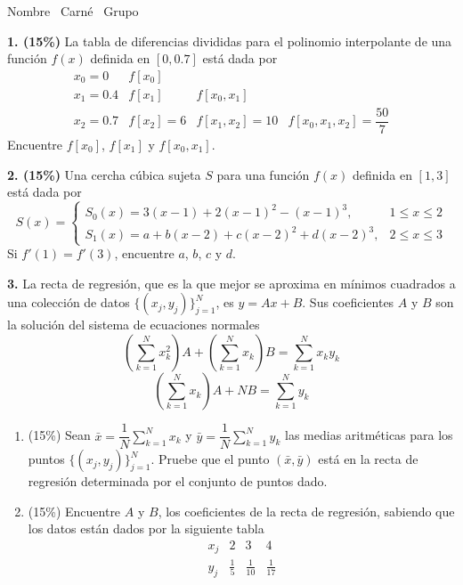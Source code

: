 \documentclass[11pt]{article}
\begin{document}
\examheader

\vspace{6pt}
\noindent Nombre \dotfill\ Carné \dotfill\ Grupo \dotfill

\vspace{10pt}
\noindent\textbf{1. (15\%)} La tabla de diferencias divididas para el polinomio interpolante de una función $f(x)$ definida en $[0,0.7]$ está dada por
\[
\begin{array}{c|c|c|c}
x_0=0 & f[x_0] & & \\ \hline
x_1=0.4 & f[x_1] & f[x_0,x_1] & \\ \hline
x_2=0.7 & f[x_2]=6 & f[x_1,x_2]=10 & f[x_0,x_1,x_2]=\dfrac{50}{7}
\end{array}
\]
Encuentre $f[x_0]$, $f[x_1]$ y $f[x_0,x_1]$.

\vspace{5mm}
\noindent\textbf{2. (15\%)} Una cercha cúbica sujeta $S$ para una función $f(x)$ definida en $[1,3]$ está dada por
\[
S(x)=\begin{cases}
S_0(x)=3(x-1)+2(x-1)^2-(x-1)^3, & 1\leq x\leq 2\\
S_1(x)=a+b(x-2)+c(x-2)^2+d(x-2)^3, & 2\leq x\leq 3
\end{cases}
\]
Si $f'(1)=f'(3)$, encuentre $a$, $b$, $c$ y $d$.

\vspace{5mm}
\noindent\textbf{3.} La recta de regresión, que es la que mejor se aproxima en mínimos cuadrados a una colección de datos $\{(x_j,y_j)\}_{j=1}^{N}$, es $y=Ax+B$. Sus coeficientes $A$ y $B$ son la solución del sistema de ecuaciones normales
\[
\left(\sum_{k=1}^N x_k^2\right)A+\left(\sum_{k=1}^N x_k\right)B=\sum_{k=1}^N x_ky_k
\]
\[
\left(\sum_{k=1}^N x_k\right)A+NB=\sum_{k=1}^N y_k
\]
\begin{enumerate}
\item[a.] (15\%) Sean $\bar x=\dfrac1N\displaystyle\sum_{k=1}^N x_k$ y $\bar y=\dfrac1N\displaystyle\sum_{k=1}^N y_k$ las medias aritméticas para los puntos $\{(x_j,y_j)\}_{j=1}^N$. Pruebe que el punto $(\bar x,\bar y)$ está en la recta de regresión determinada por el conjunto de puntos dado.
\item[b.] (15\%) Encuentre $A$ y $B$, los coeficientes de la recta de regresión, sabiendo que los datos están dados por la siguiente tabla
\[
\begin{array}{c|c|c|c}
x_j & 2 & 3 & 4\\ \hline
y_j & \frac15 & \frac1{10} & \frac1{17}
\end{array}
\]
\end{enumerate}
\end{document}
